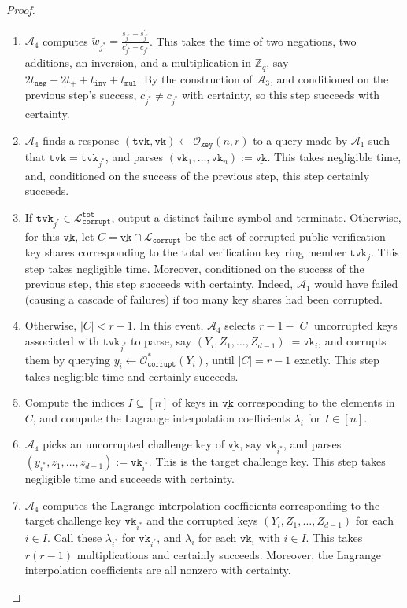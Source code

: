 \documentclass[11pt]{article}
\theoremstyle{definition}
\newcommand{\vk}{\texttt{vk}}
\newcommand{\tvk}{\texttt{tvk}}
\newcommand{\VK}{\underline{\texttt{vk}}}
\newcommand{\Zq}{\mathbb{Z}_q}
\newcommand{\corruptionOracle}{\mathcal{O}_{\texttt{corrupt}}}
\newcommand{\keyOracle}{\mathcal{O}_{\texttt{key}}}
\begin{document}
\begin{proof}
\begin{enumerate}
\item $\mathcal{A}_4$ computes $\widetilde{w}_{j^*} = \frac{s_{j^*} - s_{j^*}^\prime}{c_{j^*}^\prime - c_{j^*}}$. This takes the time of two negations, two additions, an inversion, and a multiplication in $\Zq$, say $2t_{\texttt{neg}} + 2t_{+} + t_{\texttt{inv}} + t_{\texttt{mul}}$. By the construction of $\mathcal{A}_3$, and conditioned on the previous step's success, $c_{j^*}^\prime \neq c_{j^*}$ with certainty, so this step succeeds with certainty.

\item $\mathcal{A}_4$ finds a response $(\tvk, \VK) \leftarrow \keyOracle(n,r)$ to a query made by $\mathcal{A}_1$ such that $\tvk = \tvk_{j^*}$, and parses $(\vk_1, \ldots, \vk_n) := \VK$. This takes negligible time, and, conditioned on the success of the previous step, this step certainly succeeds.


\item If $\tvk_{j^*} \in \mathcal{L}^{\texttt{tot}}_{\texttt{corrupt}}$, output a distinct failure symbol and terminate. Otherwise, for this $\VK$, let $C = \VK \cap \mathcal{L}_{\texttt{corrupt}}$ be the set of corrupted public verification key shares corresponding to the total verification key ring member $\tvk_j$. This step takes negligible time. Moreover, conditioned on the success of the previous step, this step succeeds with certainty. Indeed, $\mathcal{A}_1$ would have failed (causing a cascade of failures) if too many key shares had been corrupted.


\item Otherwise, $\left|C\right| < r-1$. In this event, $\mathcal{A}_4$ selects $r-1-\left|C\right|$ uncorrupted keys associated with $\tvk_{j^*}$ to parse, say $(Y_i, Z_1, \ldots, Z_{d-1}) := \vk_i$, and corrupts them by querying $y_i \leftarrow \corruptionOracle^*(Y_i)$, until $\left|C\right| = r-1$ exactly. This step takes negligible time and certainly succeeds. 

\item Compute the indices $I \subseteq [n]$ of keys in $\VK$ corresponding to the elements in $C$, and compute the Lagrange interpolation coefficients $\lambda_i$ for $I \in [n]$.

\item $\mathcal{A}_4$ picks an uncorrupted challenge key of $\VK$, say $\vk_{i^*}$, and parses $(y_{i^*}, z_1, \ldots, z_{d-1}) :=  \vk_{i^*}$. This is the target challenge key. This step takes negligible time and succeeds with certainty.

\item $\mathcal{A}_4$ computes the Lagrange interpolation coefficients corresponding to the target challenge key $\vk_{i^*}$ and the corrupted keys $(Y_i, Z_1, \ldots, Z_{d-1})$ for each $i \in I$. Call these $\lambda_{i^*}$ for $\vk_{i^*}$, and $\lambda_i$ for each $\vk_i$ with $i \in I$. This takes $r(r-1)$ multiplications and certainly succeeds. Moreover, the Lagrange interpolation coefficients are all nonzero with certainty.



\end{enumerate}
\end{proof}
\end{document}
